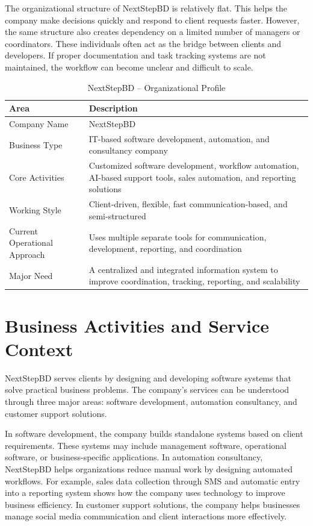 \documentclass[12pt,a4paper]{report}
\begin{document}
The organizational structure of NextStepBD is relatively flat. This helps the company make decisions quickly and respond to client requests faster. However, the same structure also creates dependency on a limited number of managers or coordinators. These individuals often act as the bridge between clients and developers. If proper documentation and task tracking systems are not maintained, the workflow can become unclear and difficult to scale.

\begin{table}[H]
\centering
\caption{NextStepBD -- Organizational Profile}
\renewcommand{\arraystretch}{1.3}
\begin{tabularx}{\textwidth}{|p{4cm}|X|}
\hline
\rowcolor{secondary}
\textbf{Area} & \textbf{Description} \\
\hline
Company Name & NextStepBD \\
\hline
Business Type & IT-based software development, automation, and consultancy company \\
\hline
Core Activities & Customized software development, workflow automation, AI-based support tools, sales automation, and reporting solutions \\
\hline
Working Style & Client-driven, flexible, fast communication-based, and semi-structured \\
\hline
Current Operational Approach & Uses multiple separate tools for communication, development, reporting, and coordination \\
\hline
Major Need & A centralized and integrated information system to improve coordination, tracking, reporting, and scalability \\
\hline
\end{tabularx}
\end{table}

\section{Business Activities and Service Context}

NextStepBD serves clients by designing and developing software systems that solve practical business problems. The company’s services can be understood through three major areas: software development, automation consultancy, and customer support solutions.

In software development, the company builds standalone systems based on client requirements. These systems may include management software, operational software, or business-specific applications. In automation consultancy, NextStepBD helps organizations reduce manual work by designing automated workflows. For example, sales data collection through SMS and automatic entry into a reporting system shows how the company uses technology to improve business efficiency. In customer support solutions, the company helps businesses manage social media communication and client interactions more effectively.
\end{document}
